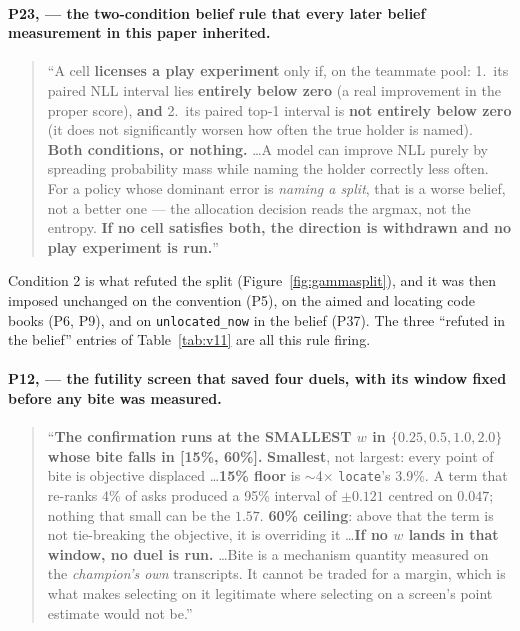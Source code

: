 \paragraph{P23, \protect{} --- the two-condition belief rule
that every later belief measurement in this paper inherited.}

\begin{quote}
``A cell \textbf{licenses a play experiment} only if, on the teammate pool:
1.\ its paired NLL interval lies \textbf{entirely below zero} (a real
improvement in the proper score), \textbf{and} 2.\ its paired top-1 interval is
\textbf{not entirely below zero} (it does not significantly worsen how often
the true holder is named). \textbf{Both conditions, or nothing.} \ldots A model
can improve NLL purely by spreading probability mass while naming the holder
correctly less often. For a policy whose dominant error is \emph{naming a
split}, that is a worse belief, not a better one --- the allocation decision
reads the argmax, not the entropy. \textbf{If no cell satisfies both, the
direction is withdrawn and no play experiment is run.}''
\end{quote}

\noindent Condition 2 is what refuted the split (Figure~\ref{fig:gammasplit}),
and it was then imposed unchanged on the convention (P5), on the aimed and
locating code books (P6, P9), and on \texttt{unlocated\_now} in the belief
(P37). The three ``refuted in the belief'' entries of Table~\ref{tab:v11} are
all this rule firing.

\paragraph{P12, \protect{} --- the futility screen
that saved four duels, with its window fixed before any bite was measured.}

\begin{quote}
``\textbf{The confirmation runs at the SMALLEST $w$ in $\{0.25, 0.5, 1.0,
2.0\}$ whose bite falls in [15\%, 60\%].} \textbf{Smallest}, not largest: every
point of bite is objective displaced \ldots \textbf{15\% floor} is
$\sim$4$\times$ \texttt{locate}'s 3.9\%. A term that re-ranks 4\% of asks
produced a 95\% interval of $\pm 0.121$ centred on $0.047$; nothing that small
can be the $1.57$. \textbf{60\% ceiling}: above that the term is not
tie-breaking the objective, it is overriding it \ldots \textbf{If no $w$ lands
in that window, no duel is run.} \ldots Bite is a mechanism quantity measured
on the \emph{champion's own} transcripts. It cannot be traded for a margin,
which is what makes selecting on it legitimate where selecting on a screen's
point estimate would not be.''
\end{quote}

